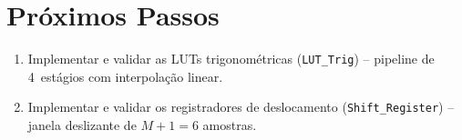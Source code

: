 \documentclass[a4paper,12pt]{article}
\begin{document}
\section{Pr\'oximos Passos}

\begin{enumerate}
    \item Implementar e validar as LUTs trigonom\'etricas (\texttt{LUT\_Trig}) -- pipeline de 4~est\'agios com interpola\c{c}\~ao linear.
    \item Implementar e validar os registradores de deslocamento (\texttt{Shift\_Register}) -- janela deslizante de $M+1=6$ amostras.
\end{enumerate}
\end{document}
